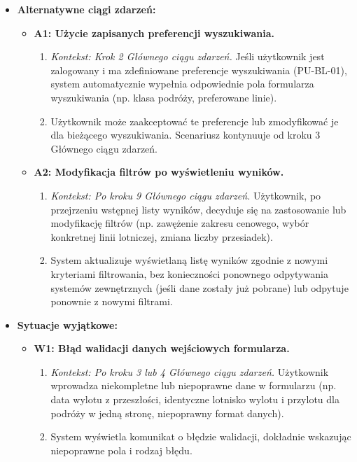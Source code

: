 \documentclass[a4paper,12pt]{article}
\begin{document}
\begin{itemize}
\begin{enumerate}
        \end{enumerate}
    \item \textbf{Alternatywne ciągi zdarzeń:}
        \begin{itemize}
            \item \textbf{A1: Użycie zapisanych preferencji wyszukiwania.}
                \begin{enumerate}
                    \item \textit{Kontekst: Krok 2 Głównego ciągu zdarzeń.} Jeśli użytkownik jest zalogowany i ma zdefiniowane preferencje wyszukiwania (PU-BL-01), system automatycznie wypełnia odpowiednie pola formularza wyszukiwania (np. klasa podróży, preferowane linie).
                    \item Użytkownik może zaakceptować te preferencje lub zmodyfikować je dla bieżącego wyszukiwania. Scenariusz kontynuuje od kroku 3 Głównego ciągu zdarzeń.
                \end{enumerate}
            \item \textbf{A2: Modyfikacja filtrów po wyświetleniu wyników.}
                \begin{enumerate}
                    \item \textit{Kontekst: Po kroku 9 Głównego ciągu zdarzeń.} Użytkownik, po przejrzeniu wstępnej listy wyników, decyduje się na zastosowanie lub modyfikację filtrów (np. zawężenie zakresu cenowego, wybór konkretnej linii lotniczej, zmiana liczby przesiadek).
                    \item System aktualizuje wyświetlaną listę wyników zgodnie z nowymi kryteriami filtrowania, bez konieczności ponownego odpytywania systemów zewnętrznych (jeśli dane zostały już pobrane) lub odpytuje ponownie z nowymi filtrami.
                \end{enumerate}
        \end{itemize}
    \item \textbf{Sytuacje wyjątkowe:}
        \begin{itemize}
            \item \textbf{W1: Błąd walidacji danych wejściowych formularza.}
                \begin{enumerate}
                    \item \textit{Kontekst: Po kroku 3 lub 4 Głównego ciągu zdarzeń.} Użytkownik wprowadza niekompletne lub niepoprawne dane w formularzu (np. data wylotu z przeszłości, identyczne lotnisko wylotu i przylotu dla podróży w jedną stronę, niepoprawny format danych).
                    \item System wyświetla komunikat o błędzie walidacji, dokładnie wskazując niepoprawne pola i rodzaj błędu.

\end{enumerate}
\end{itemize}
\end{itemize}
\end{document}
